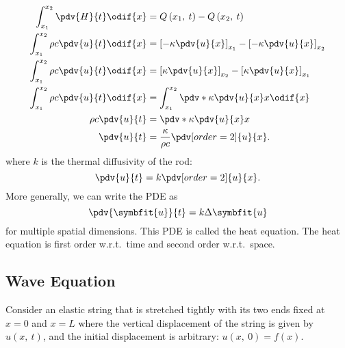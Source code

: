 \documentclass{article}
\begin{document}
\begin{align*}
    \int_{x_1}^{x_2} \pdv{H}{t} \odif{x}        & = Q\left( x_1,\: t \right) - Q\left( x_2,\: t \right)                               \\
    \int_{x_1}^{x_2} \rho c \pdv{u}{t} \odif{x} & = \left[ -\kappa \pdv{u}{x} \right]_{x_1} - \left[ -\kappa \pdv{u}{x} \right]_{x_2} \\
    \int_{x_1}^{x_2} \rho c \pdv{u}{t} \odif{x} & = \left[ \kappa \pdv{u}{x} \right]_{x_2} - \left[ \kappa \pdv{u}{x} \right]_{x_1}   \\
    \int_{x_1}^{x_2} \rho c \pdv{u}{t} \odif{x} & = \int_{x_1}^{x_2} \pdv*{\kappa \pdv{u}{x}}{x} \odif{x}                             \\
    \rho c \pdv{u}{t}                           & = \pdv*{\kappa \pdv{u}{x}}{x}                                                       \\
    \pdv{u}{t}                                  & = \frac{\kappa}{\rho c} \pdv[order=2]{u}{x}.
\end{align*}
where \(k\) is the thermal diffusivity of the rod:
\begin{equation*}
    \pdv{u}{t} = k\pdv[order=2]{u}{x}.
\end{equation*}
More generally, we can write the PDE as
\begin{equation*}
    \pdv{\symbfit{u}}{t} = k \Delta{\symbfit{u}}
\end{equation*}
for multiple spatial dimensions. This PDE is called the heat equation.
The heat equation is first order w.r.t.\ time and second order w.r.t.\ space.
\subsection{Wave Equation}
Consider an elastic string that is stretched tightly with its two ends
fixed at \(x = 0\) and \(x = L\) where the vertical displacement of the
string is given by \(u\left( x,\: t \right)\), and the initial
displacement is arbitrary: \(u\left( x,\: 0 \right) = f\left( x
\right)\).
\end{document}
